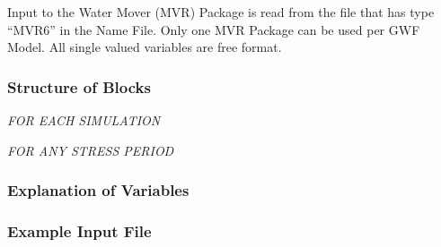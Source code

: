 Input to the Water Mover (MVR) Package is read from the file that has type ``MVR6'' in the Name File.  Only one MVR Package can be used per GWF Model.  All single valued variables are free format.

\vspace{5mm}
\subsubsection{Structure of Blocks}
\vspace{5mm}

\noindent \textit{FOR EACH SIMULATION}



\vspace{5mm}
\noindent \textit{FOR ANY STRESS PERIOD}


\vspace{5mm}
\subsubsection{Explanation of Variables}
\begin{description}

\end{description}

\vspace{5mm}
\subsubsection{Example Input File}

